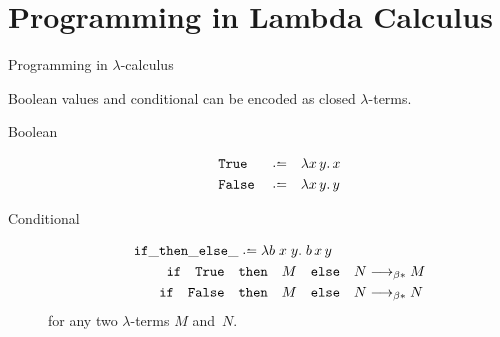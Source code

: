 \section{Programming in Lambda Calculus}
\begin{frame}[allowframebreaks]{Programming in $\lambda$-calculus}
  
Boolean values and conditional can be encoded as closed $\lambda$-terms. 
  
\begin{description}
  \item[Boolean]
    \begin{align*}
      & \mathtt{True}  && \defeq && \lambda x\,y.\, x \\
      & \mathtt{False} && \defeq && \lambda x\,y.\, y
    \end{align*}

  \item[Conditional]
    \begin{align*}
      \mathtt{if}\_\mathtt{then}\_\mathtt{else}\_
      & \defeq \lambda b\;x\;y.\;b\,x\,y  \\
      \mathtt{if} \quad\mathtt{True} \quad & \mathtt{then}\quad M\quad\mathtt{else}\quad
      N  \reduce M \\
      \mathtt{if} \quad\mathtt{False} \quad &\mathtt{then}\quad M\quad\mathtt{else}\quad
      N \reduce N
    \end{align*}
    for any two $\lambda$-terms $M$ and~$N$.
\end{description}


\end{frame}
